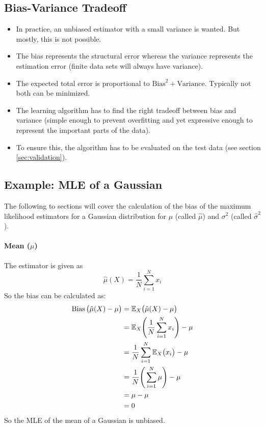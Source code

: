 		\subsection{Bias-Variance Tradeoff}
			\begin{itemize}
				\item In practice, an unbiased estimator with a small variance is wanted. But mostly, this is not possible.
				\item The bias represents the structural error whereas the variance represents the estimation error (finite data sets will always have variance).
				\item The expected total error is proportional to \( \textrm{Bias}^2 + \textrm{Variance} \). Typically not both can be minimized.
				\item The learning algorithm has to find the right tradeoff between bias and variance (simple enough to prevent overfitting and yet expressive enough to represent the important parts of the data).
				\item To ensure this, the algorithm has to be evaluated on the test data (see section \ref{sec:validation}).
			\end{itemize}

		\subsection{Example: MLE of a Gaussian} %
			The following to sections will cover the calculation of the bias of the maximum likelihood estimators for a Gaussian distribution for \(\mu\) (called \(\hat{\mu}\)) and \(\sigma^2\) (called \(\hat{\sigma}^2\)).

			\paragraph{Mean (\(\mu\))}
				The estimator is given as
				\begin{equation}
					\hat{\mu}(X) = \frac{1}{N} \sum_{i = 1}^{N} x_i
				\end{equation}
				So the bias can be calculated as:
				\begin{align}
					\operatorname{Bias}\big(\hat{\mu}(X) - \mu\big) &= \mathbb{E}_X\big(\hat{\mu}(X) - \mu\big) \\
						&= \mathbb{E}_X\Bigg( \frac{1}{N} \sum_{i = 1}^{N} x_i \Bigg) - \mu \\
						&= \frac{1}{N} \sum_{i = 1}^{N} \mathbb{E}_X\big(x_i\big) - \mu \\
						&= \frac{1}{N} \Bigg( \sum_{i = 1}^{N} \mu \Bigg) - \mu \\
						&= \mu - \mu \\
						&= 0
				\end{align}
				So the MLE of the mean of a Gaussian is unbiased.

